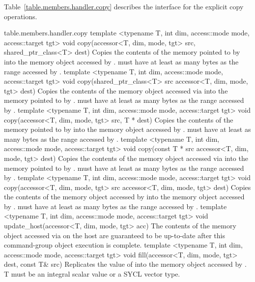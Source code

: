 Table~\ref{table.members.handler.copy} describes the interface for the 
explicit copy operations.

{table.members.handler.copy}
  \addRowThreeL
    {template <typename T, int dim, access::mode mode, access::target tgt>}
    {void copy(accessor<T, dim, mode, tgt> src,}
    { shared_ptr_class<T> dest)}
    { Copies the contents of the memory pointed to by  into the
      memory object accessed by .
       must have at least as many bytes as the 
      range accessed by .}
  \addRowThreeL
    {template <typename T, int dim, access::mode mode, access::target tgt>}
    {void copy(shared_ptr_class<T> src}
    { accessor<T, dim, mode, tgt> dest)}
    { Copies the contents of the memory object accessed via  
      into the memory pointed to by .
       must have at least as many bytes as the 
      range accessed by .}
  \addRowThreeL
    {template <typename T, int dim, access::mode mode, access::target tgt>}
    {void copy(accessor<T, dim, mode, tgt> src,}
    { T * dest)}
    { Copies the contents of the memory pointed to by  into the
      memory object accessed by .
       must have at least as many bytes as the 
      range accessed by .}
  \addRowThreeL
    {template <typename T, int dim, access::mode mode, access::target tgt>}
    {void copy(const T * src}
    { accessor<T, dim, mode, tgt> dest)}
    { Copies the contents of the memory object accessed via  
      into the memory pointed to by .
       must have at least as many bytes as the 
      range accessed by .}
  \addRowThreeL
    {template <typename T, int dim, access::mode mode, access::target tgt>}
    {void copy(accessor<T, dim, mode, tgt> src}
    { accessor<T, dim, mode, tgt> dest)}
    { Copies the contents of the memory object accessed by  
      into the memory object accessed by .
       must have at least as many bytes as the 
      range accessed by .}
  \addRowTwoL
    {template <typename T, int dim, access::mode mode, access::target tgt>}
    {void update_host(accessor<T, dim, mode, tgt> acc)}
    { The contents of the memory object accessed via  
      on the host are guaranteed to be up-to-date after this 
      \gls{command-group} object execution is complete.}
  \addRowThreeL
    {template <typename T, int dim, access::mode mode, access::target tgt>}
    {void fill(accessor<T, dim, mode, tgt> dest,}
    {          const T\& src)}
    {Replicates the value of  into the
      memory object accessed by .
      T must be an integral scalar value or a SYCL vector type.
    }

